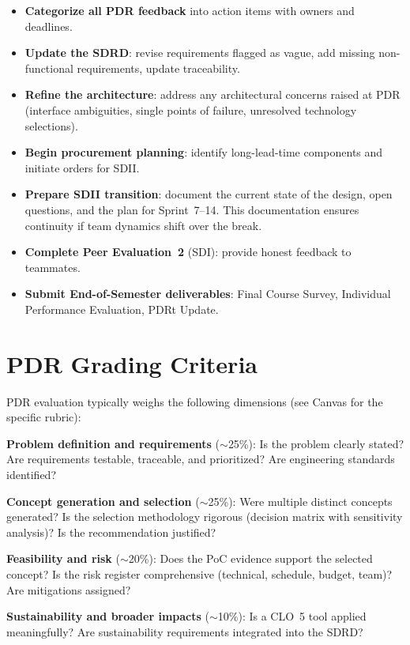 \begin{itemize}[nosep,leftmargin=1.5em]
\item \textbf{Categorize all PDR feedback} into action items with owners and deadlines.
\item \textbf{Update the SDRD}: revise requirements flagged as vague, add missing non-functional requirements, update traceability.
\item \textbf{Refine the architecture}: address any architectural concerns raised at PDR (interface ambiguities, single points of failure, unresolved technology selections).
\item \textbf{Begin procurement planning}: identify long-lead-time components and initiate orders for SDII.
\item \textbf{Prepare SDII transition}: document the current state of the design, open questions, and the plan for Sprint~7--14. This documentation ensures continuity if team dynamics shift over the break.
\item \textbf{Complete Peer Evaluation~2} (SDI): provide honest feedback to teammates.
\item \textbf{Submit End-of-Semester deliverables}: Final Course Survey, Individual Performance Evaluation, PDRt Update.
\end{itemize}


\section{PDR Grading Criteria}
PDR evaluation typically weighs the following dimensions (see Canvas for the specific rubric):

\textbf{Problem definition and requirements} ($\sim$25\%): Is the problem clearly stated? Are requirements testable, traceable, and prioritized? Are engineering standards identified?

\textbf{Concept generation and selection} ($\sim$25\%): Were multiple distinct concepts generated? Is the selection methodology rigorous (decision matrix with sensitivity analysis)? Is the recommendation justified?

\textbf{Feasibility and risk} ($\sim$20\%): Does the PoC evidence support the selected concept? Is the risk register comprehensive (technical, schedule, budget, team)? Are mitigations assigned?

\textbf{Sustainability and broader impacts} ($\sim$10\%): Is a CLO~5 tool applied meaningfully? Are sustainability requirements integrated into the SDRD?

